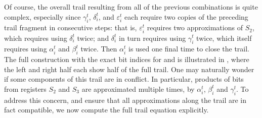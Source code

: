 Of course, the overall trail resulting from all of the previous combinations is quite complex, especially since $\gamma^t_i$, $\delta^t_i$, and $\varepsilon^t_i$ each require two copies of the preceding trail fragment in consecutive steps: that is, $\varepsilon^t_i$ requires two approximations of $S_2$, which requires using $\delta^t_i$ twice; and $\delta^t_i$ in turn requires using $\gamma^t_i$ twice, which itself requires using $\alpha^t_i$ and $\beta^t_i$ twice. Then $\alpha^t_i$ is used one final time to close the trail.
The full construction with the exact bit indices for \MiniMORUS[640] and
\MiniMORUS[1280] is illustrated in , where the left
and right half each show half of the full trail.
One may naturally wonder if some components of this trail are in conflict. In particular, products of bits from registers $S_2$ and $S_3$ are approximated multiple times, by $\alpha^t_i$, $\beta^t_i$ and $\gamma^t_i$. To address this concern, and ensure that all approximations along the trail are in fact compatible, we now compute the full trail equation explicitly.

